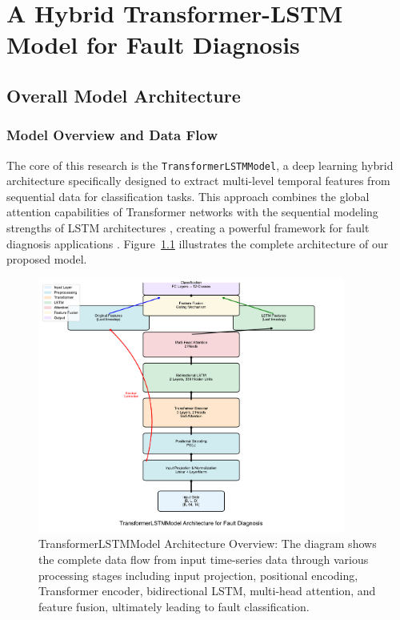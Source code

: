 \chapter{A Hybrid Transformer-LSTM Model for Fault Diagnosis}
\label{cha:hybrid_model}

\section{Overall Model Architecture}
\label{sec:hybrid_model:architecture}

\subsection{Model Overview and Data Flow}

The core of this research is the \texttt{TransformerLSTMModel}, a deep learning hybrid architecture specifically designed to extract multi-level temporal features from sequential data for classification tasks. This approach combines the global attention capabilities of Transformer networks \citep{vaswani2017attention} with the sequential modeling strengths of LSTM architectures \citep{hochreiter1997long}, creating a powerful framework for fault diagnosis applications \citep{zhang2019deep, zhao2019deep}. Figure~\ref{fig:hybrid_architecture} illustrates the complete architecture of our proposed model.

\begin{figure}[htbp]
\centering
\includegraphics[width=0.9\textwidth]{logos/hybrid_architecture.pdf}
\caption{TransformerLSTMModel Architecture Overview: The diagram shows the complete data flow from input time-series data through various processing stages including input projection, positional encoding, Transformer encoder, bidirectional LSTM, multi-head attention, and feature fusion, ultimately leading to fault classification.}
\label{fig:hybrid_architecture}
\end{figure}

